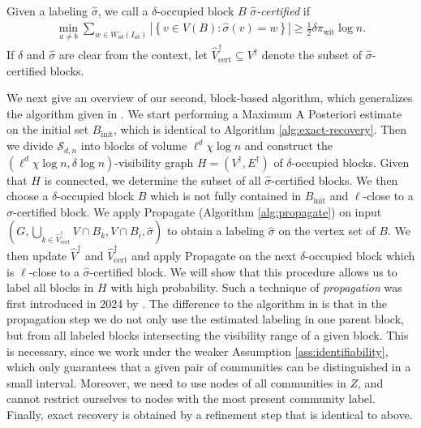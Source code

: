 \documentclass[11pt, a4paper]{amsart}
\newcommand{\1}{\mathbf{1}}
\theoremstyle{definition}
\theoremstyle{remark}
\theoremstyle{definition}
\begin{document}
Given a labeling $\hat\sigma$, we call a $\delta$-occupied block $B$
\emph{$\hat\sigma$-certified} if
\begin{align}
\min_{a\neq b}
\sum_{w\in W_{ab}(I_{ab})}
\left|
\left\{
v\in V(B):\hat\sigma(v)=w
\right\}
\right|
\ge
\frac12\delta\pi_{\mathrm{wit}}\log n.
\label{def:certified}
\end{align}
If $\delta$ and $\hat \sigma$ are clear from the context, let $\hat V_{\mathrm{cert}}^\dagger \subseteq V^\dagger$ denote the subset of $\hat \sigma$-certified blocks. 

\medskip
We next give an overview of our second, block-based algorithm, which generalizes the algorithm given in \cite{gaudio2026jan}. We start performing a Maximum A Posteriori estimate on the initial set $B_{\mathrm{init}}$, which is identical to Algorithm \ref{alg:exact-recovery}. Then we divide $\mathcal S_{d,n}$ into blocks of volume $\ell^d \chi \log n$ and construct the $(\ell^d \chi \log n,\delta \log n)$-visibility graph $H=(V^\dagger,E^\dagger)$ of $\delta$-occupied blocks. Given that $H$ is connected, we determine the subset of all $\hat \sigma$-certified blocks. We then choose a $\delta$-occupied block $B$ which is not fully contained in $B_{\mathrm{init}}$ and $\ell$-close to a $\hat \sigma$-certified block. We apply Propagate (Algorithm \ref{alg:propagate}) on input $(G, \bigcup_{k \in \hat V_{\mathrm{cert}}^\dagger} V \cap B_k, V \cap B_i,\hat \sigma)$ to obtain a labeling $\hat \sigma$ on the vertex set of $B$. We then update $\hat V^\dagger$ and $\hat V_{\mathrm{cert}}^\dagger$ and apply Propagate on the next $\delta$-occupied block which is $\ell$-close to a $\hat \sigma$-certified block. We will show that this procedure allows us to label all blocks in $H$ with high probability. Such a technique of \textit{propagation} was first introduced in 2024 by \cite{gaudio2024exactcommunityrecoverygeometric}. The difference to the algorithm in \cite{gaudio2026jan} is that in the propagation step we do not only use the estimated labeling in one parent block, but from all labeled blocks intersecting the visibility range of a given block. This is necessary, since we work under the weaker Assumption \ref{ass:identifiability}, which only guarantees that a given pair of communities can be distinguished in a small interval. Moreover, we need to use nodes of all communities in $Z$, and cannot restrict ourselves to nodes with the most present community label. Finally, exact recovery is obtained by a refinement step that is identical to above.
\end{document}
